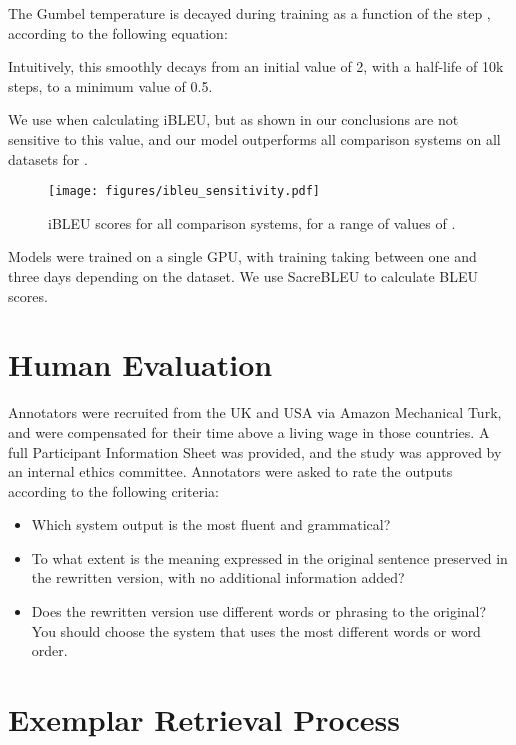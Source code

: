 \documentclass[11pt]{article}
\begin{document}
The Gumbel temperature  is decayed during training as a function of the step , according to the following equation:

Intuitively, this smoothly decays  from an initial value of 2, with a half-life of 10k steps, to a minimum value of 0.5.

We use  when calculating iBLEU, but as shown in  our conclusions are not sensitive to this value, and our model outperforms all comparison systems on all datasets for .

\begin{figure*}[t!]
    \centering
    \texttt{[image: figures/ibleu\_sensitivity.pdf]}
    \vspace{-0.2cm}
    \caption{iBLEU scores for all comparison systems, for a range of values of .}
    \label{fig:ibleusens}
\end{figure*}

Models were trained on a single GPU, with training taking between one and three days depending on the dataset. We use SacreBLEU \cite{post-2018-call} to calculate BLEU scores.

\section{Human Evaluation}
\label{app:humeval}

Annotators were recruited from the UK and USA via Amazon Mechanical Turk, and were compensated for their time above a living wage in those countries. A full Participant Information Sheet was provided, and the study was approved by an internal ethics committee. Annotators were asked to rate the outputs according to the following criteria:

\begin{itemize}
    \item Which system output is the most fluent and grammatical?
    \item To what extent is the meaning expressed in the original sentence preserved in the rewritten version, with no additional information added?
    \item Does the rewritten version use different words or phrasing to the original? You should choose the system that uses the most different words or word order.
\end{itemize}

\section{Exemplar Retrieval Process}
\label{app:exemplars}
\end{document}
